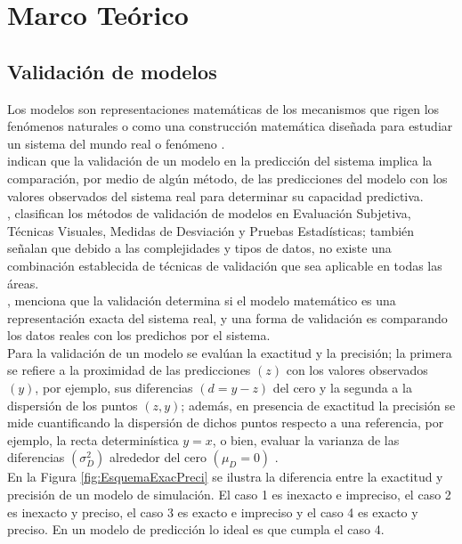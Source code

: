 \section{Marco Teórico}

\subsection{Validación de modelos}
Los modelos son representaciones matemáticas de los mecanismos que rigen los fenómenos naturales \parencite{tedeschi-2006} o como una construcción matemática diseñada para estudiar un sistema del mundo real o fenómeno \parencite{giordano-1997}.\\

\textcite{medina-peralta-2017} indican que la validación de un modelo en la predicción del sistema implica la comparación, por medio de algún método, de las predicciones del modelo con los valores observados del sistema real para determinar su capacidad predictiva.\\

\textcite{mayer-butler-1993}, clasifican los métodos de validación de modelos en Evaluación Subjetiva, Técnicas Visuales, Medidas de Desviación y Pruebas Estadísticas; también señalan que debido a las complejidades y tipos de datos, no existe una combinación establecida de técnicas de validación que sea aplicable en todas las áreas.\\

\textcite{halachmi-2004}, menciona que la validación determina si el modelo matemático es una representación exacta del sistema real, y una forma de validación es comparando los datos reales con los predichos por el sistema.\\

Para la validación de un modelo se evalúan la exactitud y la precisión; la primera se refiere a la proximidad de las predicciones $( z )$  con los valores observados $( y )$, por ejemplo, sus diferencias $ ( d=y-z ) $ del cero y la segunda a la dispersión de los puntos $ (z, y) $; además, en presencia de exactitud la precisión se mide cuantificando la dispersión de dichos puntos respecto a una referencia, por ejemplo, la recta determinística  $ y=x $, o bien, evaluar la varianza de las diferencias $ (\sigma_{D}^{2}) $ alrededor del cero $ (\mu_{D}=0) $ \parencite{medina-peralta-2017}.\\


En la Figura \ref{fig:EsquemaExacPreci} se ilustra la diferencia entre la exactitud y precisión de un modelo de simulación. El caso 1 es inexacto e impreciso, el caso 2 es inexacto y preciso, el caso 3 es exacto e impreciso y el caso 4 es exacto y preciso. En un modelo de predicción lo ideal es que cumpla el caso 4. 

